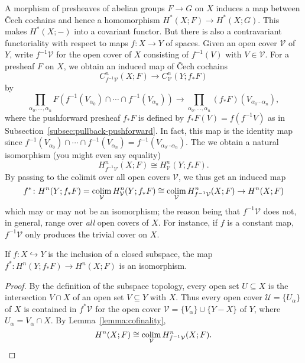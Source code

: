 \documentclass[a4paper,openany]{scrbook}
\begin{document}
A morphism of presheaves of abelian groups $F \to G$ on $X$ induces a map between \v Cech cochains and hence a homomorphism $H^*(X;F) \to H^*(X;G)$. This makes $H^*(X;-)$ into a covariant functor. But there is also a contravariant functoriality with respect to maps $f\colon X \to Y$ of spaces. Given an open cover $\mathcal V$ of $Y$, write $f^{-1}\mathcal V$ for the open cover of $X$ consisting of $f^{-1}(V)$ with $V \in \mathcal V$. For a presheaf $F$ on $X$, we obtain an induced map of \v Cech cochains
\[
C^n_{f^{-1}\mathcal V}(X;F) \to C^n_{\mathcal V}(Y;f_*F)
\]
by
\[
\prod_{\alpha_0,\dots,\alpha_n} F(f^{-1}(V_{\alpha_0}) \cap \cdots \cap f^{-1}(V_{\alpha_n})) \to \prod_{\alpha_0,\dots,\alpha_n} (f_*F)(V_{\alpha_0\cdots\alpha_n}),
\]
where the pushforward presheaf $f_*F$ is defined by $f_*F(V)=f(f^{-1}V)$ as in Subsection~\ref{subsec:pullback-pushforward}. In fact, this map is the identity map since $f^{-1}(V_{\alpha_0}) \cap \cdots \cap f^{-1}(V_{\alpha_n}) = f^{-1}(V_{\alpha_0\cdots\alpha_n})$.
The we obtain a natural isomorphism (you might even say equality)
\[
H_{f^{-1}\mathcal V}^n(X;F) \cong H_{\mathcal V}^n(Y;f_*F).
\]
By passing to the colimit over all open covers $\mathcal V$, we thus get an induced map
\begin{equation}\label{eq:inducedmaponcohomology}
f^*\colon H^n(Y;f_*F) =\operatorname*{colim}_{\mathcal V} H^n_{\mathcal V}(Y;f_*F) \cong \operatorname*{colim}_{\mathcal V} H^n_{f^{-1}\mathcal V}(X;F) \to  H^n(X;F)
\end{equation}
which may or may not be an isomorphism; the reason being that $f^{-1}\mathcal V$ does not, in general, range over \emph{all} open covers of $X$. For instance, if $f$ is a constant map, $f^{-1}\mathcal V$ only produces the trivial cover on $X$.

\begin{lemma}\label{lemma:basechangeiso}
If $f\colon X \hookrightarrow Y$ is the inclusion of a closed subspace, the map $f^*\colon H^n(Y;f_*F) \to H^n(X;F)$ is an isomorphism.
\end{lemma}
\begin{proof}
By the definition of the subspace topology, every open set $U \subseteq X$ is the intersection $V \cap X$ of an open set $V \subseteq Y$ with $X$. Thus every open cover $\mathcal U = \{U_\alpha\}$ of $X$ is contained in $f^*\mathcal V$ for the open cover $\mathcal V = \{V_\alpha\} \cup \{Y-X\}$ of $Y$, where $U_\alpha = V_\alpha \cap X$. By Lemma~\ref{lemma:cofinality},
\[
H^n(X;F) \cong \operatorname*{colim}_{\mathcal V}H^n_{f^{-1}\mathcal V}(X;F).\qedhere
\]
\end{proof}
\end{document}
